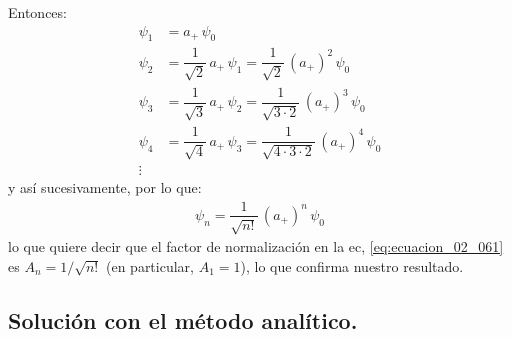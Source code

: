 Entonces:
\begin{align*}
\psi_{1} &= a_{+} \, \psi_{0} \\[0.5em]
\psi_{2} &= \dfrac{1}{\sqrt{2}} \, a_{+} \, \psi_{1} = \dfrac{1}{\sqrt{2}} \, (a_{+})^{2} \, \psi_{0} \\[0.5em]
\psi_{3} &= \dfrac{1}{\sqrt{3}} \, a_{+} \, \psi_{2} = \dfrac{1}{\sqrt{3 \cdot 2}} \, (a_{+})^{3} \, \psi_{0} \\[0.5em]
\psi_{4} &= \dfrac{1}{\sqrt{4}} \, a_{+} \, \psi_{3} = \dfrac{1}{\sqrt{4 \cdot 3 \cdot 2}} \, (a_{+})^{4} \, \psi_{0} \\[0.5em]
\vdots
\end{align*}
y así sucesivamente, por lo que:
\begin{align}
\psi_{n} = \dfrac{1}{\sqrt{n!}} \, (a_{+})^{n} \, \psi_{0}
\label{eq:ecuacion_02_067}
\end{align}
lo que quiere decir que el factor de normalización en la ec, \ref{eq:ecuacion_02_061} es $A_{n} = 1 / \sqrt{n!}$  (en particular, $A_{1} = 1$), lo que confirma nuestro resultado.

\subsection{Solución con el método analítico.}

